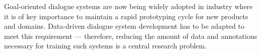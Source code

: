Goal-oriented dialogue systems are now being widely adopted in industry where it is of key importance to maintain a rapid prototyping cycle for new products and domains. Data-driven dialogue system development has to be adapted to meet this requirement --- therefore, reducing the amount of data and annotations necessary for training such systems is a central research problem.